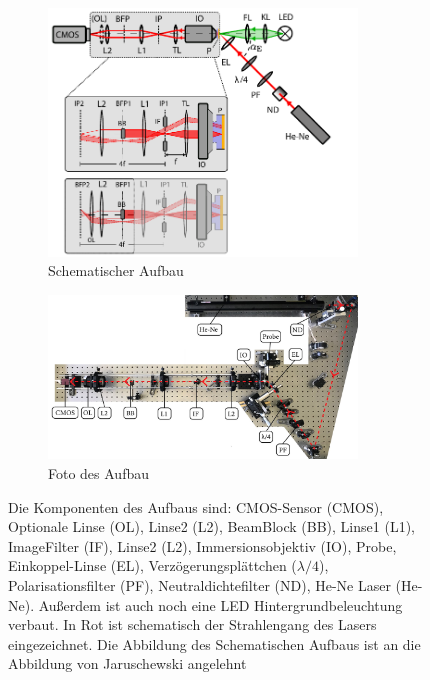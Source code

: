 \documentclass[titlepage]{article}
\begin{document}
	\begin{figure}
		\centering
		\begin{subfigure}[b]{0.9\textwidth}		
			\centering
			\includegraphics[width=0.9\textwidth]{figures/Aufbau_Schema.pdf}
			\caption{Schematischer Aufbau}			
			\label{fig:aufbau_schema}
		\end{subfigure}
		\vfil
		\begin{subfigure}[b]{0.9\textwidth} 
			\centering
			\includegraphics[width=0.9\textwidth]{figures/aufsicht_aufbau_anotated.jpg}
			\caption{Foto des Aufbau}
			\label{fig:aufsicht_aufbau_anotated}
		\end{subfigure}
		\caption{Die Komponenten des Aufbaus sind: CMOS-Sensor (CMOS), Optionale Linse (OL), Linse2 (L2), BeamBlock (BB), Linse1 (L1), ImageFilter (IF), Linse2 (L2), Immersionsobjektiv (IO), Probe, Einkoppel-Linse (EL), Verzögerungsplättchen ($\lambda/4$), Polarisationsfilter (PF), Neutraldichtefilter (ND), He-Ne Laser (He-Ne). Außerdem ist auch noch eine LED Hintergrundbeleuchtung verbaut. In Rot ist schematisch der Strahlengang des Lasers eingezeichnet. Die Abbildung des Schematischen Aufbaus ist an die Abbildung von Jaruschewski \cite{Jaruschewski.2020} angelehnt}
		\label{fig:Aufbau}
	\end{figure}
\end{document}
